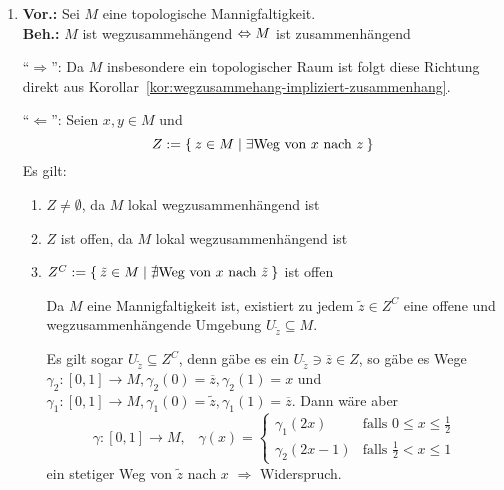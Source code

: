 \begin{solution}[\ref{ub4:aufg1}]
    \begin{enumerate}[label=(\alph*)]
        \item \textbf{Vor.:} Sei $M$ eine topologische Mannigfaltigkeit.\\
              \textbf{Beh.:} $M$ ist wegzusammehängend $\Leftrightarrow M$ ist zusammenhängend
              \begin{beweis}
                \enquote{$\Rightarrow$}: Da $M$ insbesondere ein
                topologischer Raum ist folgt diese Richtung direkt 
                aus Korollar~\ref{kor:wegzusammehang-impliziert-zusammenhang}.

                \enquote{$\Leftarrow$}: Seien $x,y \in M$ und
                \[Z := \Set{z \in M | \exists \text{Weg von } x \text{ nach } z}\]
                Es gilt:
                \begin{enumerate}[label=(\roman*)]
                    \item $Z \neq \emptyset$, da $M$ lokal wegzusammenhängend ist
                    \item $Z$ ist offen, da $M$ lokal wegzusammenhängend ist
                    \item $Z^C := \Set{\tilde{z} \in M | \nexists \text{Weg von } x \text{ nach } \tilde{z}}$ ist offen

                    Da $M$ eine Mannigfaltigkeit ist, existiert zu jedem
                    $\tilde{z} \in Z^C$ eine offene und wegzusammenhängende Umgebung 
                    $U_{\tilde{z}} \subseteq M$.

                    Es gilt sogar $U_{\tilde{z}} \subseteq Z^C$, denn
                    gäbe es ein $U_{\tilde{z}} \ni \overline{z} \in Z$,
                    so gäbe es Wege $\gamma_2:[0,1] \rightarrow M, \gamma_2(0) = \overline{z}, \gamma_2(1) = x$
                    und $\gamma_1:[0,1] \rightarrow M, \gamma_1(0) = \tilde{z}, \gamma_1(1) = \overline{z}$.
                    Dann wäre aber
                    \[\gamma:[0,1] \rightarrow M,\;\;\; \gamma(x) = \begin{cases}
                        \gamma_1(2x)   &\text{falls } 0 \leq x \leq \frac{1}{2}\\
                        \gamma_2(2x-1) &\text{falls } \frac{1}{2} < x \leq 1
                        \end{cases}\]
                    ein stetiger Weg von $\tilde{z}$ nach $x$
                    $\Rightarrow$ Widerspruch.


\end{enumerate}
\end{beweis}
\end{enumerate}
\end{solution}
